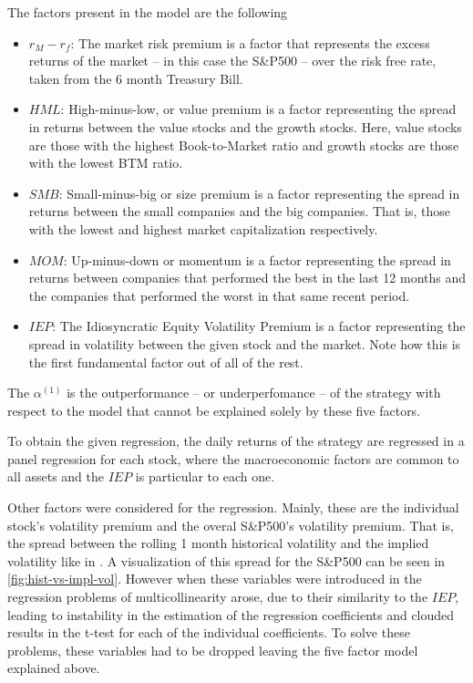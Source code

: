 The factors present in the model are the following 
\begin{itemize}
    \item $r_M-r_f$: The market risk premium is a factor that represents the excess returns of the market -- in this case the S\&P500 -- over the risk free rate, taken from the 6 month Treasury Bill. 
    \item $HML$: High-minus-low, or value premium is a factor representing the spread in returns between the value stocks and the growth stocks. Here, value stocks are those with the highest Book-to-Market ratio and growth stocks are those with the lowest BTM ratio.
    \item $SMB$: Small-minus-big or size premium is a factor representing the spread in returns between the small companies and the big companies. That is, those with the lowest and highest market capitalization respectively.
    \item $MOM$: Up-minus-down or momentum is a factor representing the spread in returns between companies that performed the best in the last 12 months and the companies that performed the worst in that same recent period. 
    \item $IEP$: The Idiosyncratic Equity Volatility Premium is a factor representing the spread in volatility between the given stock and the market. Note how this is the first fundamental factor out of all of the rest.
\end{itemize}

The $\alpha^{(1)}$ is the outperformance -- or underperfomance -- of the strategy with respect to the model that cannot be explained solely by these five factors. 

To obtain the given regression, the daily returns of the strategy are regressed in a panel regression for each stock, where the macroeconomic factors are common to all assets and the $IEP$ is particular to each one. 

Other factors were considered for the regression. Mainly, these are the individual stock's volatility premium and the overal S\&P500's volatility premium. That is, the spread between the rolling 1 month historical volatility and the implied volatility like in \cite{dierckx_2022}. A visualization of this spread for the S\&P500 can be seen in \autoref{fig:hist-vs-impl-vol}. However when these variables were introduced in the regression problems of multicollinearity arose, due to their similarity to the $IEP$, leading to instability in the estimation of the regression coefficients and clouded results in the t-test for each of the individual coefficients. To solve these problems, these variables had to be dropped leaving the five factor model explained above.

